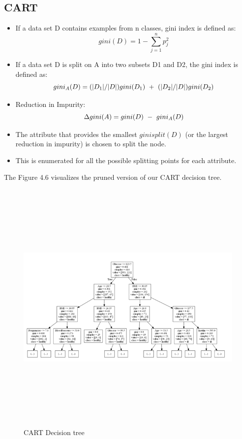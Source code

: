 \subsection{CART}
\begin{itemize}
    \item If a data set D contains examples from n classes, gini index is defined as:
    \[ gini(D) = 1 - \sum_{j=1}^{n} p_j^2    \]
    \item If a data set D is split on A into two subsets D1 and D2, the gini index is defined as:
    \[ gini_A(D) = (|D_1| / |D|)gini(D_1) \hspace{0.12cm} + \hspace{0.12cm} (|D_2| / |D|)gini(D_2)    \]
    \item Reduction in Impurity:
    \[ \Delta gini(A) = gini(D) \hspace{0.12cm} - \hspace{0.12cm} gini_A(D) \]
    \item The attribute that provides the smallest $ginisplit(D)$ (or the largest reduction in impurity) is chosen to split the node.
    \item This is enumerated for all the possible splitting points for each attribute.
\end{itemize}
The Figure 4.6 visualizes the pruned version of our CART decision tree.
\begin{figure}[h]
\centering
\includegraphics[width=7in,height=5in]{cart.PNG}
\caption{\label{fig:subBDDs1}CART Decision tree}
\end{figure}
